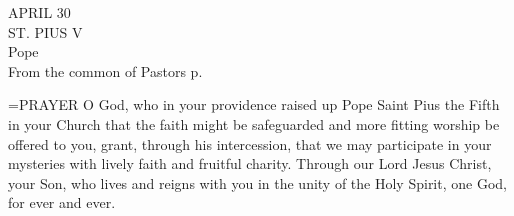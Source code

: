 \begin{center}\normalsize APRIL 30\\
\footnotesize ST. PIUS V\\
\footnotesize Pope\\
\footnotesize From the common of Pastors p. \\
\end{center}

\hangindent=\parindent \small{PRAYER 
O God, who in your providence
raised up Pope Saint Pius the Fifth in your Church
that the faith might be safeguarded
and more fitting worship be offered to you,
grant, through his intercession,
that we may participate in your mysteries
with lively faith and fruitful charity.
Through our Lord Jesus Christ, your Son,
who lives and reigns with you in the unity of the Holy Spirit,
one God, for ever and ever.\\}
 
